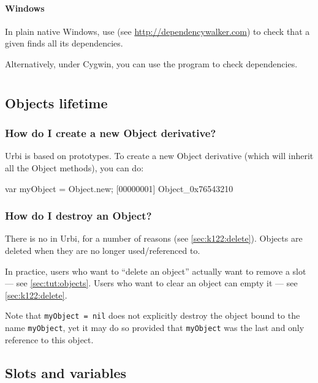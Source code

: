 \paragraph{Windows}

In plain native Windows, use  (see
\url{http://dependencywalker.com}) to check that a given  finds
all its dependencies.

Alternatively, under Cygwin, you can use the  program
to check dependencies.


\section{\us}
\subsection{Objects lifetime}

\subsubsection{How do I create a new Object derivative?}
Urbi is based on prototypes. To create a new Object derivative (which
will inherit all the Object methods), you can do:

\begin{urbiscript}
var myObject = Object.new;
[00000001] Object_0x76543210
\end{urbiscript}

\subsubsection{How do I destroy an Object?}
There is no  in Urbi, for a number of reasons (see
\autoref{sec:k122:delete}).  Objects are deleted when they are no
longer used/referenced to.

In practice, users who want to ``delete an object'' actually want to
remove a slot --- see \autoref{sec:tut:objects}.  Users who want to
clear an object can empty it --- see \autoref{sec:k122:delete}.

Note that \lstinline{myObject = nil} does not explicitly destroy the
object bound to the name \lstinline{myObject}, yet it may do
so provided that \lstinline{myObject} was the last and only reference
to this object.

\subsection{Slots and variables}

